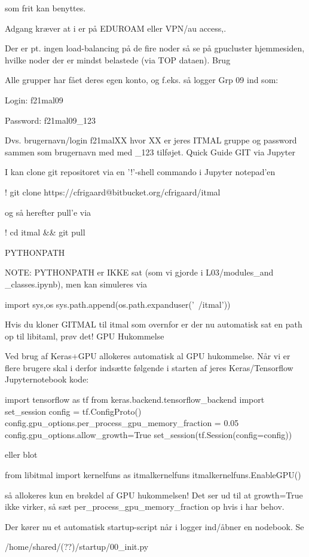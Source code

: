 som frit kan benyttes.

Adgang kræver at i er på EDUROAM eller VPN/au access,.

Der er pt. ingen load-balancing på de fire noder så se på gpucluster hjemmesiden, hvilke noder der er mindst belastede (via TOP dataen).
Brug

Alle grupper har fået deres egen konto, og f.eks. så logger Grp 09 ind som:

Login: f21mal09

Password: f21mal09_123

Dvs. brugernavn/login f21malXX hvor XX er jeres ITMAL gruppe og password sammen som brugernavn med med _123 tilføjet.
Quick Guide
GIT via Jupyter

I kan clone git repositoret via en '!'-shell commando i Jupyter notepad'en

! git clone https://cfrigaard@bitbucket.org/cfrigaard/itmal

og så herefter pull'e via

! cd itmal && git pull 

PYTHONPATH

NOTE: PYTHONPATH er IKKE sat (som vi gjorde i L03/modules_and _classes.ipynb), men kan simuleres via

import sys,os sys.path.append(os.path.expanduser('~/itmal'))

Hvis du kloner GITMAL til itmal som overnfor er der nu automatisk sat en path op til libitaml, prøv det!
GPU Hukommelse

Ved brug af Keras+GPU allokeres automatisk al GPU hukommelse. Når vi er flere brugere skal i derfor indsætte følgende i starten af jeres Keras/Tensorflow Jupyternotebook kode:

import tensorflow as tf
from keras.backend.tensorflow_backend import set_session
config = tf.ConfigProto()
config.gpu_options.per_process_gpu_memory_fraction = 0.05
config.gpu_options.allow_growth=True
set_session(tf.Session(config=config))

eller blot

from libitmal import kernelfuns as itmalkernelfuns
itmalkernelfuns.EnableGPU()

så allokeres kun en brøkdel af GPU hukommelsen! Det ser ud til at growth=True ikke virker, så sæt per_process_gpu_memory_fraction op hvis i har behov.

Der kører nu et automatisk startup-script når i logger ind/åbner en nodebook. Se

/home/shared/(??)/startup/00_init.py

